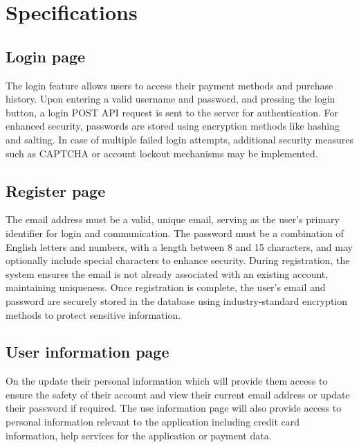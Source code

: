 \documentclass[conference]{IEEEtran}
\begin{document}
\section{Specifications}

\subsection{Login page}
The login feature allows users to access their payment methods and purchase history. Upon entering a valid username and password, and pressing the login button, a login POST API request is sent to the server for authentication. For enhanced security, passwords are stored using encryption methods like hashing and salting. In case of multiple failed login attempts, additional security measures such as CAPTCHA or account lockout mechanisms may be implemented.

\subsection{Register page}
 The email address must be a valid, unique email, serving as the user’s primary identifier for login and communication. The password must be a combination of English letters and numbers, with a length between 8 and 15 characters, and may optionally include special characters to enhance security. During registration, the system ensures the email is not already associated with an existing account, maintaining uniqueness. Once registration is complete, the user’s email and password are securely stored in the database using industry-standard encryption methods to protect sensitive information.
 
 \subsection{User information page}
 On the update their personal information which will provide them access to ensure the safety of their account and view their current email address or update their password if required. The use information page will also provide access to personal information relevant to the application including credit card information, help services for the application or payment data.
 
\end{document}
